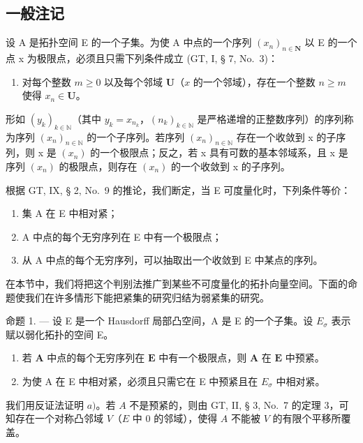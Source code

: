 \subsection{一般注记}

设 A 是拓扑空间 E 的一个子集。为使 A 中点的一个序列 \((x_{n})_{n\in\mathbf{N}}\) 以 E 的一个点 x 为极限点，必须且只需下列条件成立 (GT, I, § 7, No.~3)：

\begin{enumerate}
\def\labelenumi{(\Alph{enumi})}
\tightlist
\item
  对每个整数 \(m \geqslant 0\) 以及每个邻域 \(\mathbf{U}\)（\(x\) 的一个邻域），存在一个整数 \(n \geqslant m\) 使得 \(x_{n} \in \mathbf{U}\)。
\end{enumerate}

形如 \((y_{k})_{k\in\mathbb{N}}\)（其中 \(y_{k}=x_{n_{k}}\)，\((n_{k})_{k\in\mathbb{N}}\) 是严格递增的正整数序列）的序列称为序列 \((x_{n})_{n\in\mathbb{N}}\) 的一个子序列。若序列 \((x_{n})_{n\in\mathbb{N}}\) 存在一个收敛到 x 的子序列，则 x 是 \((x_{n})\) 的一个极限点；反之，若 x 具有可数的基本邻域系，且 x 是序列 \((x_{n})\) 的极限点，则存在 \((x_{n})\) 的一个收敛到 x 的子序列。

根据 GT, IX, § 2, No.~9 的推论，我们断定，当 E 可度量化时，下列条件等价：

\begin{enumerate}
\def\labelenumi{\alph{enumi})}
\item
  集 A 在 E 中相对紧；
\item
  A 中点的每个无穷序列在 E 中有一个极限点；
\item
  从 A 中点的每个无穷序列，可以抽取出一个收敛到 E 中某点的序列。
\end{enumerate}

在本节中，我们将把这个判别法推广到某些不可度量化的拓扑向量空间。下面的命题使我们在许多情形下能把紧集的研究归结为弱紧集的研究。

命题 1. --- 设 E 是一个 Hausdorff 局部凸空间，A 是 E 的一个子集。设 \(E_{\sigma}\) 表示赋以弱化拓扑的空间 E。

\begin{enumerate}
\def\labelenumi{\alph{enumi})}
\item
  若 \(\mathbf{A}\) 中点的每个无穷序列在 \(\mathbf{E}\) 中有一个极限点，则 \(\mathbf{A}\) 在 \(\mathbf{E}\) 中预紧。
\item
  为使 A 在 E 中相对紧，必须且只需它在 E 中预紧且在 \(E_{\sigma}\) 中相对紧。
\end{enumerate}

我们用反证法证明 \(a)\)。若 \(A\) 不是预紧的，则由 GT, II, § 3, No.~7 的定理 3，可知存在一个对称凸邻域 \(V\)（\(E\) 中 0 的邻域），使得 \(A\) 不能被 \(V\) 的有限个平移所覆盖。


